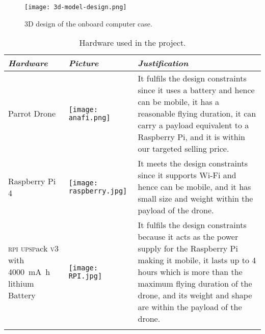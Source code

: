\documentclass[../main.tex]{subfiles}
\begin{document}
\begin{figure}[tbp]
	\centering
	\texttt{[image: 3d-model-design.png]}
	\caption{3D design of the onboard computer case.}
	\label{fig:3d-design}
\end{figure}


\begin{table}[p]
	\centering
	\caption{Hardware used in the project.}
	\label{tab:hardware-used}  
	\begin{tabular}{ p{4cm} p{3cm} p{6cm} }
		\toprule
		\textit{Hardware} 
		& \textit{Picture} 
		& \textit{Justification} \\ 
		
		\midrule
		
		Parrot \anafi Drone  
		& \begin{minipage}{.1\textwidth}
			\texttt{[image: anafi.png]}
		\end{minipage} 
                & It fulfils the design constraints since it uses a
                battery and hence can be mobile, it has a reasonable
                flying duration, it can carry a payload equivalent
                to a Raspberry Pi, and it is within our targeted
                selling price. \\ 
		\addlinespace
		
		Raspberry Pi 4  
		& \begin{minipage}{.0\textwidth}
			\texttt{[image: raspberry.jpg]}
		\end{minipage} 
                & It meets the design constraints since it supports
                Wi-Fi and hence can be mobile, and it has small size
                and weight within the payload of the drone. \\ 
		\addlinespace
		
		\textsc{rpi} \textsc{upsp}ack \textsc{v}3 with 
		\SI{4000}{\milli\ampere\hour} 
		lithium Battery  
		& \begin{minipage}{.1\textwidth}
			\texttt{[image: RPI.jpg]}
		\end{minipage}  
                & It fulfils the design constraints because it acts as
                the power supply for the Raspberry Pi making it
                mobile, it lasts up to 4 hours which is more than the
                maximum flying duration of the drone, and its weight
                and shape are within the payload of the drone.  \\ 
		\addlinespace
		

\end{tabular}
\end{table}
\end{document}
